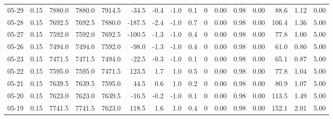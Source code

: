 \begin{threeparttable}
{\begin{tabular}{lrrrrrrrrrrrrrrr}
  05-29 &     0.15 & 7880.0 & 7880.0 & 7914.5 &      -34.5 &           -0.4 &                     -1.0 &                 0.1 &              0 &       0.00 &      0.98 &           0.00 &             88.6 &            1.12 &                   0.00 \\
  05-28 &     0.15 & 7692.5 & 7692.5 & 7880.0 &     -187.5 &           -2.4 &                     -1.0 &                 0.7 &              0 &       0.00 &      0.98 &           0.00 &            106.4 &            1.36 &                   5.00 \\
  05-27 &     0.15 & 7592.0 & 7592.0 & 7692.5 &     -100.5 &           -1.3 &                     -1.0 &                 0.4 &              0 &       0.00 &      0.98 &           0.00 &             77.8 &            1.00 &                   5.00 \\
  05-26 &     0.15 & 7494.0 & 7494.0 & 7592.0 &      -98.0 &           -1.3 &                     -1.0 &                 0.4 &              0 &       0.00 &      0.98 &           0.00 &             61.0 &            0.80 &                   5.00 \\
  05-23 &     0.15 & 7471.5 & 7471.5 & 7494.0 &      -22.5 &           -0.3 &                     -1.0 &                 0.1 &              0 &       0.00 &      0.98 &           0.00 &             65.1 &            0.87 &                   5.00 \\
  05-22 &     0.15 & 7595.0 & 7595.0 & 7471.5 &      123.5 &            1.7 &                      1.0 &                 0.5 &              0 &       0.00 &      0.98 &           0.00 &             77.8 &            1.04 &                   5.00 \\
  05-21 &     0.15 & 7639.5 & 7639.5 & 7595.0 &       44.5 &            0.6 &                      1.0 &                 0.2 &              0 &       0.00 &      0.98 &           0.00 &             80.9 &            1.07 &                   5.00 \\
  05-20 &     0.15 & 7623.0 & 7623.0 & 7639.5 &      -16.5 &           -0.2 &                     -1.0 &                 0.1 &              0 &       0.00 &      0.98 &           0.00 &            113.5 &            1.49 &                   5.00 \\
  05-19 &     0.15 & 7741.5 & 7741.5 & 7623.0 &      118.5 &            1.6 &                      1.0 &                 0.4 &              0 &       0.00 &      0.98 &           0.00 &            152.1 &            2.01 &                   5.00 \\

\end{tabular}}
\end{threeparttable}
